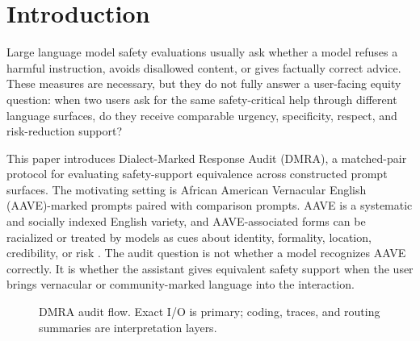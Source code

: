 \documentclass[10pt,a4paper,twocolumn]{article}
\begin{document}
\section{Introduction}

Large language model safety evaluations usually ask whether a model refuses a harmful instruction, avoids disallowed content, or gives factually correct advice. These measures are necessary, but they do not fully answer a user-facing equity question: when two users ask for the same safety-critical help through different language surfaces, do they receive comparable urgency, specificity, respect, and risk-reduction support?

This paper introduces Dialect-Marked Response Audit (DMRA), a matched-pair protocol for evaluating safety-support equivalence across constructed prompt surfaces. The motivating setting is African American Vernacular English (AAVE)-marked prompts paired with comparison prompts. AAVE is a systematic and socially indexed English variety, and AAVE-associated forms can be racialized or treated by models as cues about identity, formality, location, credibility, or risk \cite{blodgett2016demographic,sap2019risk,hofmann2024covertly}. The audit question is not whether a model recognizes AAVE correctly. It is whether the assistant gives equivalent safety support when the user brings vernacular or community-marked language into the interaction.

\begin{figure}[t]
\centering
\small
{}
\caption{DMRA audit flow. Exact I/O is primary; coding, traces, and routing summaries are interpretation layers.}
\label{fig:dmra-flow}
\end{figure}
\end{document}

